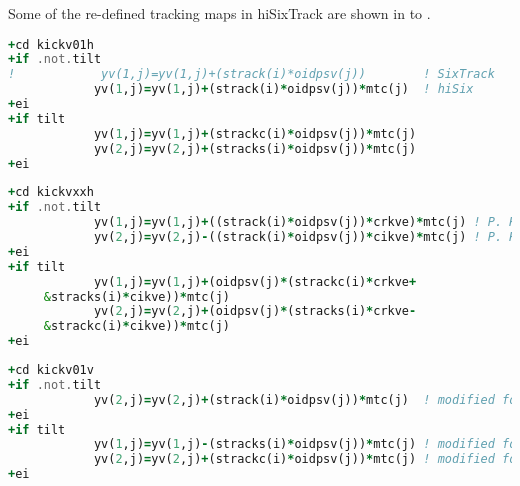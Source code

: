 Some of the re-defined tracking maps in hiSixTrack are shown in  to . 


\vspace{0.5cm}
\begin{minipage}{\linewidth}
\begin{lstlisting}[language=Fortran,caption=Definition of the transfer map of an horizontal kicker.,label=lst:kickermagnet]
+cd kickv01h
+if .not.tilt
!            yv(1,j)=yv(1,j)+(strack(i)*oidpsv(j))        ! SixTrack
            yv(1,j)=yv(1,j)+(strack(i)*oidpsv(j))*mtc(j)  ! hiSix
+ei
+if tilt
            yv(1,j)=yv(1,j)+(strackc(i)*oidpsv(j))*mtc(j) 
            yv(2,j)=yv(2,j)+(stracks(i)*oidpsv(j))*mtc(j) 
+ei
\end{lstlisting}
\end{minipage}

\vspace{0.5cm}
\begin{minipage}{\linewidth}
\begin{lstlisting}[language=Fortran,caption=Definition of the transfer map of an horizontal kicker.]
+cd kickvxxh
+if .not.tilt
            yv(1,j)=yv(1,j)+((strack(i)*oidpsv(j))*crkve)*mtc(j) ! P. HERMES
            yv(2,j)=yv(2,j)-((strack(i)*oidpsv(j))*cikve)*mtc(j) ! P. HERMES 
+ei
+if tilt
            yv(1,j)=yv(1,j)+(oidpsv(j)*(strackc(i)*crkve+               &
     &stracks(i)*cikve))*mtc(j)
            yv(2,j)=yv(2,j)+(oidpsv(j)*(stracks(i)*crkve-               &!hr02
     &strackc(i)*cikve))*mtc(j)                                          !hr02
+ei
\end{lstlisting}
\end{minipage}

\vspace{0.5cm}
\begin{minipage}{\linewidth}
\begin{lstlisting}[language=Fortran,caption=Definition of the transfer map of a vertical dipole kick.]
+cd kickv01v
+if .not.tilt
            yv(2,j)=yv(2,j)+(strack(i)*oidpsv(j))*mtc(j)  ! modified for hiSixTrack
+ei
+if tilt
            yv(1,j)=yv(1,j)-(stracks(i)*oidpsv(j))*mtc(j) ! modified for hiSixTrack
            yv(2,j)=yv(2,j)+(strackc(i)*oidpsv(j))*mtc(j) ! modified for hiSixTrack
+ei
\end{lstlisting}
\end{minipage}

